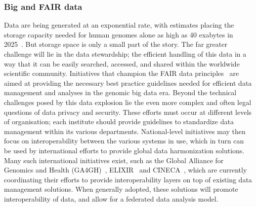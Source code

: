 \subsubsection{Big and FAIR data}
Data are being generated at an exponential rate, with estimates placing the storage capacity needed for human genomes alone as high as 40 exabytes in 2025~\cite{stephens2015}.
But storage space is only a small part of the story. The far greater challenge will lie in the data stewardship; the efficient handling of this data in a way that it can be easily searched, accessed, and shared within the worldwide scientific community.
Initiatives that champion the FAIR data principles~\cite{wilkinson2016fair} are aimed at providing the necessary best practice guidelines needed for efficient data management and analyses in the genomic big data era. Beyond the technical challenges posed by this data explosion lie the even more complex and often legal questions of data privacy and security.
These efforts must occur at different levels of organisation; each institute should provide guidelines to standardize data management within its various departments. National-level initiatives may then focus on interoperability between the various systems in use, which in turn can be used by international efforts to provide global data harmonization solutions.
Many such international initiatives exist, such as the Global Alliance for Genomics and Health (GA4GH)~\cite{ga4gh}, ELIXIR~\cite{elixir} and CINECA~\cite{cineca}, which are currently coordinating their efforts to provide interoperability layers on top of existing data management solutions.
When generally adopted, these solutions will promote interoperability of data, and allow for a federated data analysis model.


